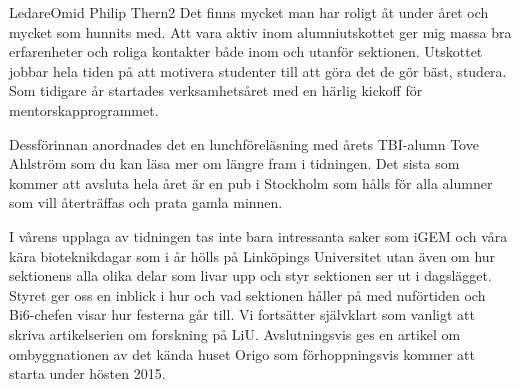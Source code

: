 
\begin{editorial}{3}{Ledare}{Omid Philip Thern}{2}
Det finns mycket man har
roligt åt under året och mycket som hunnits med. Att vara aktiv inom
alumniutskottet ger mig massa bra erfarenheter och roliga kontakter
både inom och utanför sektionen. Utskottet jobbar hela tiden på att
motivera studenter till att göra det de gör bäst, studera. Som
tidigare år startades verksamhetsåret med en härlig kickoff för
mentorskapprogrammet.

Dessförinnan anordnades det en
lunchföreläsning med årets TBI-alumn Tove Ahlström som du kan läsa mer
om längre fram i tidningen. Det sista som kommer att avsluta hela året
är en pub i Stockholm som hålls för alla alumner som vill återträffas
och prata gamla minnen.


I vårens upplaga av tidningen tas inte bara intressanta saker som iGEM
och våra kära bioteknikdagar som i år hölls på Linköpings Universitet
utan även om hur sektionens alla olika delar som livar upp och styr
sektionen ser ut i dagslägget. Styret ger oss en inblick i hur och vad
sektionen håller på med nuförtiden och Bi6-chefen visar hur festerna
går till. Vi fortsätter självklart som vanligt att skriva artikelserien om 
forskning på LiU. Avslutningsvis ges en artikel om
ombyggnationen av det kända huset Origo som förhoppningsvis kommer att
starta under hösten 2015.
\end{editorial}
